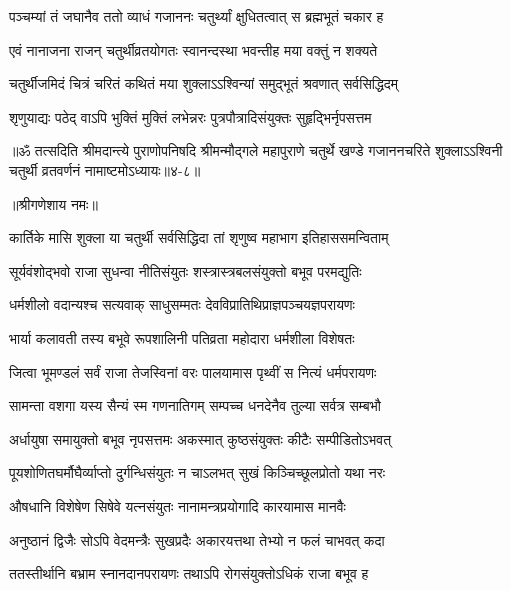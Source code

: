 \twolineshloka
{पञ्चम्यां तं जघानैव ततो व्याधं गजाननः}
{चतुर्थ्यां क्षुधितत्वात् स ब्रह्मभूतं चकार ह} %

\twolineshloka
{एवं नानाजना राजन् चतुर्थीव्रतयोगतः}
{स्वानन्दस्था भवन्तीह मया वक्तुं न शक्यते} %

\twolineshloka
{चतुर्थीजमिदं चित्रं चरितं कथितं मया}
{शुक्लाऽऽश्विन्यां समुद्भूतं श्रवणात् सर्वसिद्धिदम्} %

\twolineshloka
{श‍ृणुयाद्यः पठेद् वाऽपि भुक्तिं मुक्तिं लभेन्नरः}
{पुत्रपौत्रादिसंयुक्तः सुहृद्भिर्नृपसत्तम} %

॥ॐ तत्सदिति श्रीमदान्त्ये पुराणोपनिषदि श्रीमन्मौद्गले महापुराणे चतुर्थे खण्डे गजाननचरिते शुक्लाऽऽश्विनी चतुर्थी व्रतवर्णनं नामाष्टमोऽध्यायः॥४-८॥


\label{sec:kartika-shukla-chaturthi-mahatmya-varnanam}

\centerline{॥श्रीगणेशाय नमः॥}


\twolineshloka
{कार्तिके मासि शुक्ला या चतुर्थी सर्वसिद्धिदा}
{तां श‍ृणुष्व महाभाग इतिहाससमन्विताम्} %

\twolineshloka
{सूर्यवंशोद्भवो राजा सुधन्वा नीतिसंयुतः}
{शस्त्रास्त्रबलसंयुक्तो बभूव परमद्युतिः} %

\twolineshloka
{धर्मशीलो वदान्यश्च सत्यवाक् साधुसम्मतः}
{देवविप्रातिथिप्राज्ञपञ्चयज्ञपरायणः} %

\twolineshloka
{भार्या कलावती तस्य बभूवे रूपशालिनी}
{पतिव्रता महोदारा धर्मशीला विशेषतः} %

\twolineshloka
{जित्वा भूमण्डलं सर्वं राजा तेजस्विनां वरः}
{पालयामास पृथ्वीं स नित्यं धर्मपरायणः} %

\twolineshloka
{सामन्ता वशगा यस्य सैन्यं स्म गणनातिगम्}
{सम्पच्च धनदेनैव तुल्या सर्वत्र सम्बभौ} %

\twolineshloka
{अर्धायुषा समायुक्तो बभूव नृपसत्तमः}
{अकस्मात् कुष्ठसंयुक्तः कीटैः सम्पीडितोऽभवत्} %

\twolineshloka
{पूयशोणितघर्मौघैर्व्याप्तो दुर्गन्धिसंयुतः}
{न चाऽलभत् सुखं किञ्चिच्छूलप्रोतो यथा नरः} %

\twolineshloka
{औषधानि विशेषेण सिषेवे यत्नसंयुतः}
{नानामन्त्रप्रयोगादि कारयामास मानवैः} %

\twolineshloka
{अनुष्ठानं द्विजैः सोऽपि वेदमन्त्रैः सुखप्रदैः}
{अकारयत्तथा तेभ्यो न फलं चाभवत् कदा} %

\twolineshloka
{ततस्तीर्थानि बभ्राम स्नानदानपरायणः}
{तथाऽपि रोगसंयुक्तोऽधिकं राजा बभूव ह} %

